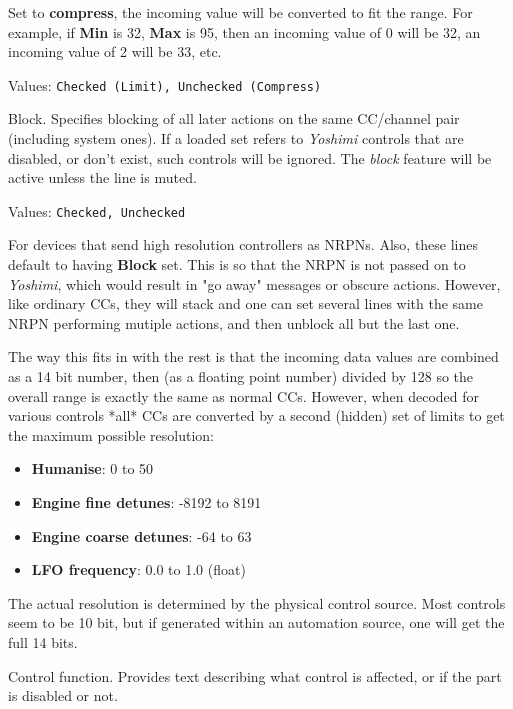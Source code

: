    Set to \textbf{compress}, the incoming value will be converted to fit
   the range. For example, if \textbf{Min} is 32, \textbf{Max} is 95, then
   an incoming value of 0 will be 32, an incoming value of 2
   will be 33, etc.

   Values: \texttt{Checked (Limit), Unchecked (Compress)}

   Block.
   Specifies blocking of all later actions on the same CC/channel pair
   (including system ones).
   If a loaded set refers to \textsl{Yoshimi} controls that are disabled, or
   don't exist, such controls will be ignored.
   The \textsl{block} feature will be active unless the line is muted.

   Values: \texttt{Checked, Unchecked}

   For devices that send high resolution controllers as NRPNs.
   Also, these lines default to having \textbf{Block} set.
   This is so that the NRPN is
   not passed on to \textsl{Yoshimi}, which would result in "go away" messages
   or obscure actions. However, like ordinary CCs, they will stack and one can set
   several lines with the same NRPN performing mutiple actions, and then unblock
   all but the last one.

   The way this fits in with the rest is that the incoming data values are
   combined as a 14 bit number, then (as a floating point number) divided by 128
   so the overall range is exactly the same as normal CCs.
   However, when decoded for various controls *all* CCs are converted by a second
   (hidden) set of limits to get the maximum possible resolution:

   \begin{itemize}
      \item \textbf{Humanise}: 0 to 50
      \item \textbf{Engine fine detunes}: -8192 to 8191
      \item \textbf{Engine coarse detunes}: -64 to 63
      \item \textbf{LFO frequency}: 0.0 to 1.0 (float)
   \end{itemize}

   The actual resolution is determined by the physical control
   source. Most controls seem to be 10 bit, but if generated within an
   automation source, one will get the full 14 bits.

   Control function.
   Provides text describing what control is affected, or if the
   part is disabled or not.

